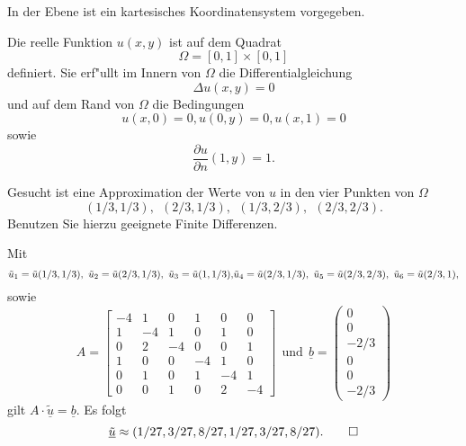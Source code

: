 In der Ebene ist ein kartesisches Koordinatensystem vorgegeben. 

Die reelle Funktion $u(x,y)$ ist auf dem Quadrat
\[
\Omega = [0,1] \times [0,1]
\]
definiert. Sie erf"ullt im Innern von $\Omega$ die Differentialgleichung
\[
\Delta u(x,y) = 0
\]
und auf dem Rand von $\Omega$ die Bedingungen
\[
u(x,0) = 0, u(0,y) = 0, u(x,1) = 0
\]
sowie
\[
\frac{\partial u}{\partial n}(1,y) = 1.
\]
\vspace{2mm}

Gesucht ist eine Approximation der Werte von $u$ in den vier Punkten von
$\Omega$
\[
(1/3,1/3), \ \  (2/3,1/3), \ \ (1/3,2/3), \ \ (2/3,2/3).
\]
Benutzen Sie hierzu geeignete Finite Differenzen.

\begin{loesung}
Mit 
\[
\tilde u_1 = \tilde u(1/3,1/3), \ \tilde u_2 = \tilde u(2/3,1/3), \ \tilde u_3 = \tilde u(1,1/3),$$ $$\tilde u_4 = \tilde u(2/3,1/3), \ \tilde u_5 = \tilde u(2/3,2/3), \ \tilde u_6 = \tilde u(2/3,1),
\]
sowie 
\[
A = \left[\begin{array}{rrrrrr} 
-4 & 1 & 0 & 1 & 0 & 0\\
1 & -4 & 1 & 0 & 1 & 0 \\
0 & 2 & -4 & 0 & 0 & 1 \\ 

1 & 0 & 0 & -4 & 1 & 0 \\
0 & 1 & 0 & 1 & -4 & 1 \\
0 & 0 & 1 & 0 & 2 & -4 \end{array}\right] \ \ \text{und} \ \
\underline{b} =  \left(\begin{array}{r} 0 \\ 0 \\ -2/3 \\ 0 \\ 0 \\ -2/3 \end{array}\right) 
\]
gilt $A \cdot \underline{\tilde u} = \underline{b}.$ Es folgt 
\[
\underline{\tilde u} \approx (1/27, 3/27, 8/27, 1/27, 3/27, 8/27).
\qedhere
\]
\end{loesung}
